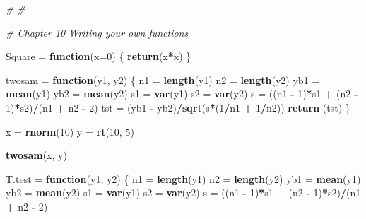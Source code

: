 \documentclass[10pt,]{krantz}
\makeatletter
\newenvironment{Shaded}{\begin{snugshade}}{\end{snugshade}}
\newcommand{\KeywordTok}[1]{\textcolor[rgb]{0.13,0.29,0.53}{\textbf{#1}}}
\newcommand{\DataTypeTok}[1]{\textcolor[rgb]{0.13,0.29,0.53}{#1}}
\newcommand{\DecValTok}[1]{\textcolor[rgb]{0.00,0.00,0.81}{#1}}
\newcommand{\StringTok}[1]{\textcolor[rgb]{0.31,0.60,0.02}{#1}}
\newcommand{\CommentTok}[1]{\textcolor[rgb]{0.56,0.35,0.01}{\textit{#1}}}
\newcommand{\ControlFlowTok}[1]{\textcolor[rgb]{0.13,0.29,0.53}{\textbf{#1}}}
\newcommand{\OperatorTok}[1]{\textcolor[rgb]{0.81,0.36,0.00}{\textbf{#1}}}
\newcommand{\NormalTok}[1]{#1}
\newenvironment{kframe}{%
\medskip{}
\setlength{\fboxsep}{.8em}
 \def\at@end@of@kframe{}%
 \ifinner\ifhmode%
  \def\at@end@of@kframe{\end{minipage}}%
  \begin{minipage}{\columnwidth}%
 \fi\fi%
 \def\FrameCommand##1{\hskip\@totalleftmargin \hskip-\fboxsep
 \colorbox{shadecolor}{##1}\hskip-\fboxsep
     \hskip-\linewidth \hskip-\@totalleftmargin \hskip\columnwidth}%
 \MakeFramed {\advance\hsize-\width
   \@totalleftmargin\z@ \linewidth\hsize
   \@setminipage}}%
 {\par\unskip\endMakeFramed%
 \at@end@of@kframe}
\renewenvironment{Shaded}{\begin{kframe}}{\end{kframe}}
\makeatother
\begin{document}
\begin{Shaded}
\begin{Highlighting}[]
   
\CommentTok{#}
\CommentTok{#}

\CommentTok{# Chapter 10 Writing your own functions}

\NormalTok{Square =}\StringTok{ }\ControlFlowTok{function}\NormalTok{(}\DataTypeTok{x=}\DecValTok{0}\NormalTok{)}
\NormalTok{\{}
  \KeywordTok{return}\NormalTok{(x}\OperatorTok{*}\NormalTok{x)}
\NormalTok{\}}

\NormalTok{twosam =}\StringTok{ }\ControlFlowTok{function}\NormalTok{(y1, y2) }
\NormalTok{\{}
\NormalTok{  n1  =}\StringTok{ }\KeywordTok{length}\NormalTok{(y1)}
\NormalTok{  n2  =}\StringTok{ }\KeywordTok{length}\NormalTok{(y2)}
\NormalTok{  yb1 =}\StringTok{ }\KeywordTok{mean}\NormalTok{(y1)}
\NormalTok{  yb2 =}\StringTok{ }\KeywordTok{mean}\NormalTok{(y2)}
\NormalTok{  s1  =}\StringTok{ }\KeywordTok{var}\NormalTok{(y1)}
\NormalTok{  s2  =}\StringTok{ }\KeywordTok{var}\NormalTok{(y2) }
\NormalTok{  s   =}\StringTok{ }\NormalTok{((n1 }\OperatorTok{-}\StringTok{ }\DecValTok{1}\NormalTok{)}\OperatorTok{*}\NormalTok{s1 }\OperatorTok{+}\StringTok{ }\NormalTok{(n2 }\OperatorTok{-}\StringTok{ }\DecValTok{1}\NormalTok{)}\OperatorTok{*}\NormalTok{s2)}\OperatorTok{/}\NormalTok{(n1 }\OperatorTok{+}\StringTok{ }\NormalTok{n2 }\OperatorTok{-}\StringTok{ }\DecValTok{2}\NormalTok{)}
\NormalTok{  tst =}\StringTok{ }\NormalTok{(yb1 }\OperatorTok{-}\StringTok{ }\NormalTok{yb2)}\OperatorTok{/}\KeywordTok{sqrt}\NormalTok{(s}\OperatorTok{*}\NormalTok{(}\DecValTok{1}\OperatorTok{/}\NormalTok{n1 }\OperatorTok{+}\StringTok{ }\DecValTok{1}\OperatorTok{/}\NormalTok{n2))}
  \KeywordTok{return}\NormalTok{ (tst)}
\NormalTok{\}}

\NormalTok{x =}\StringTok{ }\KeywordTok{rnorm}\NormalTok{(}\DecValTok{10}\NormalTok{)}
\NormalTok{y =}\StringTok{ }\KeywordTok{rt}\NormalTok{(}\DecValTok{10}\NormalTok{, }\DecValTok{5}\NormalTok{)}

\KeywordTok{twosam}\NormalTok{(x, y)}

\NormalTok{T.test =}\StringTok{ }\ControlFlowTok{function}\NormalTok{(y1, y2) }
\NormalTok{\{}
\NormalTok{  n1  =}\StringTok{ }\KeywordTok{length}\NormalTok{(y1)}
\NormalTok{  n2  =}\StringTok{ }\KeywordTok{length}\NormalTok{(y2)}
\NormalTok{  yb1 =}\StringTok{ }\KeywordTok{mean}\NormalTok{(y1)}
\NormalTok{  yb2 =}\StringTok{ }\KeywordTok{mean}\NormalTok{(y2)}
\NormalTok{  s1  =}\StringTok{ }\KeywordTok{var}\NormalTok{(y1)}
\NormalTok{  s2  =}\StringTok{ }\KeywordTok{var}\NormalTok{(y2) }
\NormalTok{  s   =}\StringTok{ }\NormalTok{((n1 }\OperatorTok{-}\StringTok{ }\DecValTok{1}\NormalTok{)}\OperatorTok{*}\NormalTok{s1 }\OperatorTok{+}\StringTok{ }\NormalTok{(n2 }\OperatorTok{-}\StringTok{ }\DecValTok{1}\NormalTok{)}\OperatorTok{*}\NormalTok{s2)}\OperatorTok{/}\NormalTok{(n1 }\OperatorTok{+}\StringTok{ }\NormalTok{n2 }\OperatorTok{-}\StringTok{ }\DecValTok{2}\NormalTok{)}


\end{Highlighting}
\end{Shaded}
\end{document}
